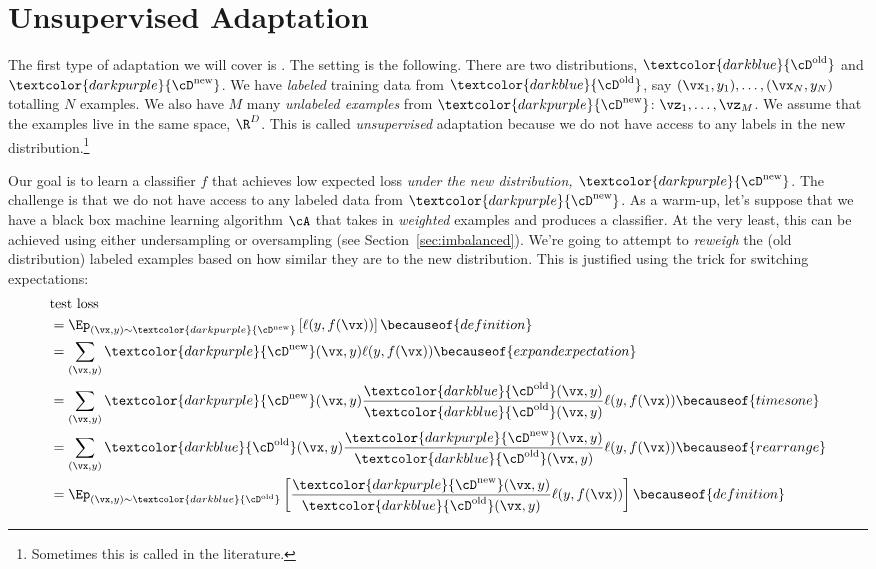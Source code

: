 \section{Unsupervised Adaptation}

\newcommand{\Dold}{\textcolor{darkblue}{\cD^{\text{old}}}}
\newcommand{\Dnew}{\textcolor{darkpurple}{\cD^{\text{new}}}}
\newcommand{\Dbase}{\textcolor{darkergreen}{\cD^{\text{base}}}}

The first type of adaptation we will cover is . The setting is the following. There are two distributions, $\Dold$ and $\Dnew$. We have \emph{labeled} training data from $\Dold$, say $(\vx_1, y_1), \dots, (\vx_N, y_N)$ totalling $N$ examples. We also have $M$ many \emph{unlabeled examples} from $\Dnew$: $\vz_1, \dots, \vz_M$. We assume that the examples live in the same space, $\R^D$. This is called \emph{unsupervised} adaptation because we do not have access to any labels in the new distribution.\footnote{Sometimes this is called  in the literature.}

Our goal is to learn a classifier $f$ that achieves low expected loss \emph{under the new distribution, $\Dnew$}.
The challenge is that we do not have access to any labeled data from $\Dnew$.
As a warm-up, let's suppose that we have a black box machine learning algorithm $\cA$ that takes in \emph{weighted} examples and produces a classifier.
At the very least, this can be achieved using either undersampling or oversampling (see Section~\ref{sec:imbalanced}).
We're going to attempt to \emph{reweigh} the (old distribution) labeled examples based on how similar they are to the new distribution.
This is justified using the  trick for switching expectations:
~
\begin{align}
&\text{test loss} \\
&= \Ep_{(\vx,y) \sim \Dnew}\left[ \ell(y, f(\vx)) \right] \becauseof{definition} \\
&= \sum_{(\vx,y)} \Dnew(\vx,y) \ell(y, f(\vx)) \becauseof{expand expectation} \\
&= \sum_{(\vx,y)} \Dnew(\vx,y) \frac {\Dold(\vx,y)} {\Dold(\vx,y)} \ell(y, f(\vx)) \becauseof{times one} \\
&= \sum_{(\vx,y)} \Dold(\vx,y) \frac {\Dnew(\vx,y)} {\Dold(\vx,y)} \ell(y, f(\vx)) \becauseof{rearrange} \\
&= \Ep_{(\vx,y) \sim \Dold}\left[ \frac {\Dnew(\vx,y)} {\Dold(\vx,y)} \ell(y, f(\vx)) \right] \becauseof{definition}
\end{align}

